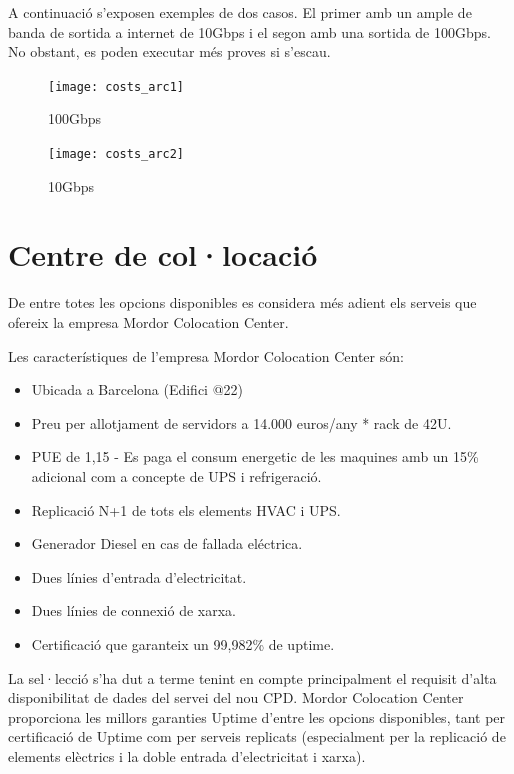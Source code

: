 \documentclass[a4paper, 11pt]{article}
\begin{document}
A continuació s'exposen exemples de dos casos. El primer amb un ample de banda de sortida a internet de 10Gbps i el segon amb una sortida de 100Gbps. No obstant, es poden executar més proves si s'escau.

\begin{figure}[H]
    \centering
    \texttt{[image: costs\_arc1]}
    \caption{100Gbps \label{fig:centralized}}    
\end{figure}


\begin{figure}[H]
    \centering
    \texttt{[image: costs\_arc2]}
    \caption{10Gbps \label{fig:centralized}}    
\end{figure}


\section{Centre de col·locació}

De entre totes les opcions disponibles es considera més adient els serveis que ofereix la empresa Mordor Colocation Center. 

Les característiques de l’empresa Mordor Colocation Center són:

\begin{itemize}
\item Ubicada a Barcelona (Edifici @22)
\item Preu per allotjament de servidors a 14.000 euros/any * rack de 42U.
\item PUE de 1,15 - Es paga el consum energetic de les maquines amb un 15\% adicional com a concepte de UPS i refrigeració.
\item Replicació N+1 de tots els elements HVAC i UPS.
\item Generador Diesel en cas de fallada eléctrica.
\item Dues línies d’entrada d’electricitat.
\item Dues línies de connexió de xarxa.
\item Certificació que garanteix un 99,982\% de uptime.
\end{itemize}

La sel·lecció s’ha dut a terme tenint en compte principalment el requisit d’alta disponibilitat de dades del servei del nou CPD. Mordor Colocation Center proporciona les millors garanties Uptime d’entre les opcions disponibles, tant per certificació de Uptime com per serveis replicats (especialment per la replicació de elements elèctrics i la doble entrada d’electricitat i xarxa).
\end{document}

